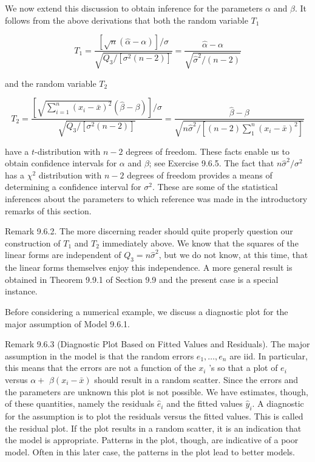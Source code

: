 We now extend this discussion to obtain inference for the parameters $\alpha$ and $\beta$. It follows from the above derivations that both the random variable $T_{1}$

$$
T_{1}=\frac{[\sqrt{n}(\hat{\alpha}-\alpha)] / \sigma}{\sqrt{Q_{3} /\left[\sigma^{2}(n-2)\right]}}=\frac{\hat{\alpha}-\alpha}{\sqrt{\hat{\sigma}^{2} /(n-2)}}
$$

and the random variable $T_{2}$


\begin{equation*}
T_{2}=\frac{\left[\sqrt{\sum_{i=1}^{n}\left(x_{i}-\bar{x}\right)^{2}}(\hat{\beta}-\beta)\right] / \sigma}{\sqrt{Q_{3} /\left[\sigma^{2}(n-2)\right]}}=\frac{\hat{\beta}-\beta}{\sqrt{n \hat{\sigma}^{2} /\left[(n-2) \sum_{1}^{n}\left(x_{i}-\bar{x}\right)^{2}\right]}} \tag{9.6.10}
\end{equation*}


have a $t$-distribution with $n-2$ degrees of freedom. These facts enable us to obtain confidence intervals for $\alpha$ and $\beta$; see Exercise 9.6.5. The fact that $n \hat{\sigma}^{2} / \sigma^{2}$ has a $\chi^{2}$ distribution with $n-2$ degrees of freedom provides a means of determining a confidence interval for $\sigma^{2}$. These are some of the statistical inferences about the parameters to which reference was made in the introductory remarks of this section.

Remark 9.6.2. The more discerning reader should quite properly question our construction of $T_{1}$ and $T_{2}$ immediately above. We know that the squares of the linear forms are independent of $Q_{3}=n \hat{\sigma}^{2}$, but we do not know, at this time, that the linear forms themselves enjoy this independence. A more general result is obtained in Theorem 9.9.1 of Section 9.9 and the present case is a special instance.

Before considering a numerical example, we discuss a diagnostic plot for the major assumption of Model 9.6.1.

Remark 9.6.3 (Diagnostic Plot Based on Fitted Values and Residuals). The major assumption in the model is that the random errors $e_{1}, \ldots, e_{n}$ are iid. In particular, this means that the errors are not a function of the $x_{i}$ 's so that a plot of $e_{i}$ versus $\alpha+$ $\beta\left(x_{i}-\bar{x}\right)$ should result in a random scatter. Since the errors and the parameters are unknown this plot is not possible. We have estimates, though, of these quantities, namely the residuals $\hat{e}_{i}$ and the fitted values $\hat{y}_{i}$. A diagnostic for the assumption is to plot the residuals versus the fitted values. This is called the residual plot. If the plot results in a random scatter, it is an indication that the model is appropriate. Patterns in the plot, though, are indicative of a poor model. Often in this later case, the patterns in the plot lead to better models.

